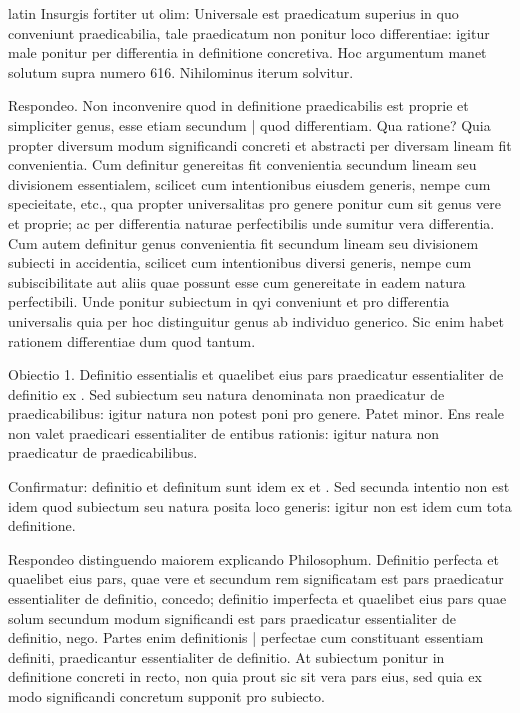 \begin{otherlanguage*}{latin}
\pstart
Insurgis fortiter ut olim:
Universale est praedicatum superius in quo conveniunt praedicabilia, tale praedicatum non ponitur loco differentiae:
igitur male ponitur per differentia in definitione concretiva. Hoc argumentum manet solutum supra numero 616. Nihilominus iterum solvitur. 
\pend

\pstart
Respondeo. Non inconvenire quod in definitione praedicabilis est proprie et simpliciter genus, esse etiam secundum \textnormal{|} quod differentiam. Qua ratione? Quia propter diversum modum significandi concreti et abstracti per diversam lineam fit convenientia. Cum definitur genereitas fit convenientia secundum lineam seu divisionem essentialem, scilicet cum intentionibus eiusdem generis, nempe cum specieitate, etc., qua propter universalitas pro genere ponitur cum sit genus vere et proprie; ac per differentia naturae perfectibilis unde sumitur vera differentia. Cum autem definitur genus convenientia fit secundum lineam seu divisionem subiecti in accidentia, scilicet cum intentionibus diversi generis, nempe cum subiscibilitate aut aliis quae possunt esse cum genereitate in eadem natura perfectibili. Unde ponitur subiectum in qyi conveniunt et pro differentia universalis quia per hoc distinguitur genus ab individuo generico. Sic enim habet rationem differentiae dum quod tantum. 
\pend

\pstart
Obiectio 1. Definitio essentialis et quaelibet eius pars praedicatur essentialiter de definitio ex . Sed subiectum seu natura denominata non praedicatur de praedicabilibus:
igitur natura non potest poni pro genere. Patet minor. Ens reale non valet praedicari essentialiter de entibus rationis:
igitur natura non praedicatur de praedicabilibus. 
\pend

\pstart
Confirmatur:
definitio et definitum sunt idem ex  et . Sed secunda intentio non est idem quod subiectum seu natura posita loco generis:
igitur non est idem cum tota definitione. 
\pend

\pstart
Respondeo distinguendo maiorem explicando Philosophum. Definitio perfecta et quaelibet eius pars, quae vere et secundum rem significatam est pars praedicatur essentialiter de definitio, concedo; definitio imperfecta et quaelibet eius pars quae solum secundum modum significandi est pars praedicatur essentialiter de definitio, nego. Partes enim definitionis \textnormal{|} perfectae cum constituant essentiam definiti, praedicantur essentialiter de definitio. At subiectum ponitur in definitione concreti in recto, non quia prout sic sit vera pars eius, sed quia ex modo significandi concretum supponit pro subiecto. 
\pend


\end{otherlanguage*}

